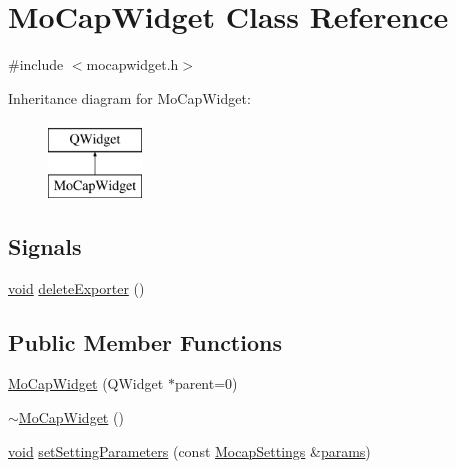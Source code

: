 \hypertarget{class_mo_cap_widget}{\section{Mo\-Cap\-Widget Class Reference}
\label{class_mo_cap_widget}
}


{\ttfamily \#include $<$mocapwidget.\-h$>$}

Inheritance diagram for Mo\-Cap\-Widget\-:\begin{figure}[H]
\begin{center}
\leavevmode
\includegraphics[height=2.000000cm]{class_mo_cap_widget}
\end{center}
\end{figure}
\subsection*{Signals}
\begin{DoxyCompactItemize}
\item 
\hyperlink{group___u_a_v_objects_plugin_ga444cf2ff3f0ecbe028adce838d373f5c}{void} \hyperlink{group___mo_cap_plugin_ga34afe7fdc30edaad2ec82fdb72275fa8}{delete\-Exporter} ()
\end{DoxyCompactItemize}
\subsection*{Public Member Functions}
\begin{DoxyCompactItemize}
\item 
\hyperlink{group___mo_cap_plugin_ga36cbb83db56d6d7eb8f5d30717d2c5e4}{Mo\-Cap\-Widget} (Q\-Widget $\ast$parent=0)
\item 
\hyperlink{group___mo_cap_plugin_gae095eb46b9b054f9601f677e9d82ad49}{$\sim$\-Mo\-Cap\-Widget} ()
\item 
\hyperlink{group___u_a_v_objects_plugin_ga444cf2ff3f0ecbe028adce838d373f5c}{void} \hyperlink{group___mo_cap_plugin_ga49fc96a517fa87b95341072a5bacd7f9}{set\-Setting\-Parameters} (const \hyperlink{group___mo_cap_plugin_ga6083347a5b3eb70e360f599354dc0f0b}{Mocap\-Settings} \&\hyperlink{glext_8h_afeb6390ab3bc8a0e96a88aff34d52288}{params})
\end{DoxyCompactItemize}


